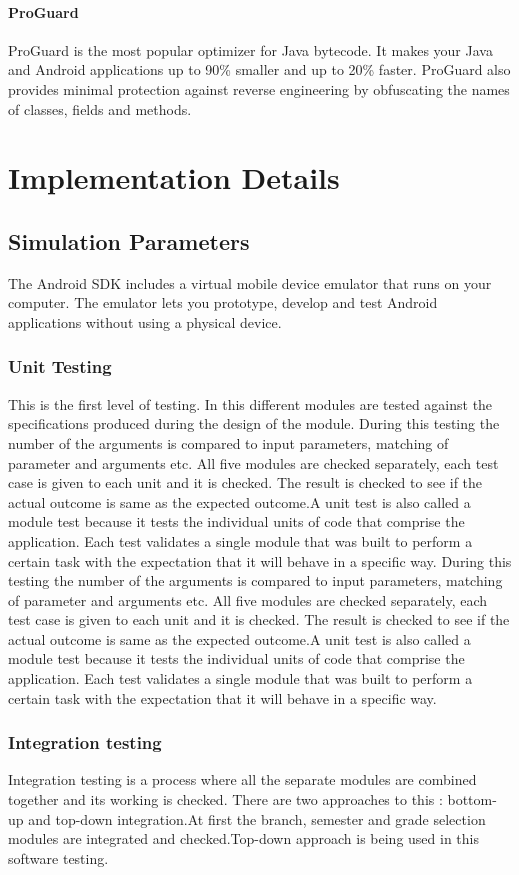 \documentclass[BTech]{srmuthesis}
\begin{document}
\paragraph{ProGuard}
ProGuard is the most popular optimizer for Java bytecode. It makes your Java and Android applications up to 90\% smaller and up to 20\% faster. ProGuard also provides minimal protection against reverse engineering by obfuscating the names of classes, fields and methods.
\section{Implementation Details}

\subsection{Simulation Parameters}
The Android SDK includes a virtual mobile device emulator that runs on your computer. The emulator lets you prototype, develop and test Android applications without using a physical device.
\subsubsection{Unit Testing}
This is the first level of testing. In this different modules are tested against the specifications produced during the design of the module. During this testing the number of the arguments is compared to input parameters, matching of parameter and arguments etc. All five modules are checked separately, each test case is given to each unit and it is checked. The result is checked to see if the actual outcome is same as the expected outcome.A unit test is also called a module test because it tests the individual units of code that comprise the application. Each test validates a single module that was built to perform a certain task with the expectation that it will behave in a specific way. During this testing the number of the arguments is compared to input parameters, matching of parameter and arguments etc. All five modules are checked separately, each test case is given to each unit and it is checked. The result is checked to see if the actual outcome is same as the expected outcome.A unit test is also called a module test because it tests the individual units of code that comprise the application. Each test validates a single module that was built to perform a certain task with the expectation that it will behave in a specific way.
\subsubsection{Integration testing}
Integration testing is a process where all the separate modules are combined together
and its working is checked. There are two approaches to this : bottom-up and top-down
integration.At first the branch, semester and grade selection modules are integrated and checked.Top-down approach is being used in this software testing.
\end{document}
